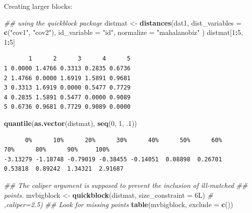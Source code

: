 \documentclass[
  12pt,
]{book}
\newenvironment{Shaded}{\begin{snugshade}}{\end{snugshade}}
\newcommand{\CommentTok}[1]{\textcolor[rgb]{0.56,0.35,0.01}{\textit{#1}}}
\newcommand{\DataTypeTok}[1]{\textcolor[rgb]{0.13,0.29,0.53}{#1}}
\newcommand{\DecValTok}[1]{\textcolor[rgb]{0.00,0.00,0.81}{#1}}
\newcommand{\FloatTok}[1]{\textcolor[rgb]{0.00,0.00,0.81}{#1}}
\newcommand{\KeywordTok}[1]{\textcolor[rgb]{0.13,0.29,0.53}{\textbf{#1}}}
\newcommand{\NormalTok}[1]{#1}
\newcommand{\OperatorTok}[1]{\textcolor[rgb]{0.81,0.36,0.00}{\textbf{#1}}}
\newcommand{\StringTok}[1]{\textcolor[rgb]{0.31,0.60,0.02}{#1}}
\theoremstyle{definition}
\theoremstyle{definition}
\theoremstyle{definition}
\theoremstyle{remark}
\begin{document}
Creating larger blocks:

\begin{Shaded}
\begin{Highlighting}[]
\CommentTok{## using the quickblock package}
\NormalTok{distmat <-}\StringTok{ }\KeywordTok{distances}\NormalTok{(dat1,}
  \DataTypeTok{dist_variables =} \KeywordTok{c}\NormalTok{(}\StringTok{"cov1"}\NormalTok{, }\StringTok{"cov2"}\NormalTok{), }\DataTypeTok{id_variable =}
    \StringTok{"id"}\NormalTok{, }\DataTypeTok{normalize =} \StringTok{"mahalanobiz"}
\NormalTok{)}
\NormalTok{distmat[}\DecValTok{1}\OperatorTok{:}\DecValTok{5}\NormalTok{, }\DecValTok{1}\OperatorTok{:}\DecValTok{5}\NormalTok{]}
\end{Highlighting}
\end{Shaded}

\begin{verbatim}
       1      2      3      4      5
1 0.0000 1.4766 0.3313 0.2835 0.6736
2 1.4766 0.0000 1.6919 1.5891 0.9681
3 0.3313 1.6919 0.0000 0.5477 0.7729
4 0.2835 1.5891 0.5477 0.0000 0.9089
5 0.6736 0.9681 0.7729 0.9089 0.0000
\end{verbatim}

\begin{Shaded}
\begin{Highlighting}[]
\KeywordTok{quantile}\NormalTok{(}\KeywordTok{as.vector}\NormalTok{(distmat), }\KeywordTok{seq}\NormalTok{(}\DecValTok{0}\NormalTok{, }\DecValTok{1}\NormalTok{, }\FloatTok{.1}\NormalTok{))}
\end{Highlighting}
\end{Shaded}

\begin{verbatim}
      0%      10%      20%      30%      40%      50%      60%      70%      80%      90%     100% 
-3.13279 -1.18748 -0.79019 -0.38455 -0.14051  0.08898  0.26701  0.53818  0.89242  1.34321  2.91687 
\end{verbatim}

\begin{Shaded}
\begin{Highlighting}[]
\CommentTok{## The caliper argument is supposed to prevent the inclusion of ill-matched}
\CommentTok{## points.}
\NormalTok{mvbigblock <-}\StringTok{ }\KeywordTok{quickblock}\NormalTok{(distmat, }\DataTypeTok{size_constraint =}\NormalTok{ 6L) }\CommentTok{# ,caliper=2.5)}
\CommentTok{## Look for missing points}
\KeywordTok{table}\NormalTok{(mvbigblock, }\DataTypeTok{exclude =} \KeywordTok{c}\NormalTok{())}
\end{Highlighting}
\end{Shaded}
\end{document}
